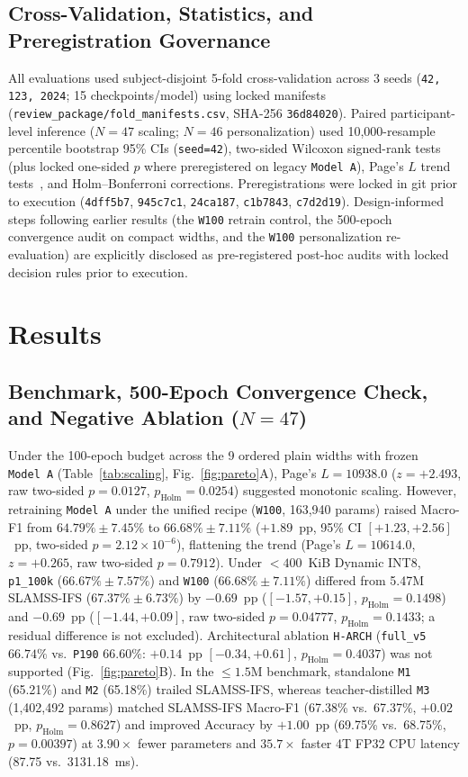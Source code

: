\documentclass[journal]{IEEEtran}
\begin{document}
\subsection{Cross-Validation, Statistics, and Preregistration Governance}
All evaluations used subject-disjoint 5-fold cross-validation across 3 seeds (\texttt{42, 123, 2024}; 15 checkpoints/model) using locked manifests (\texttt{review\_package/fold\_manifests.csv}, SHA-256 \texttt{36d84020}). Paired participant-level inference ($N=47$ scaling; $N=46$ personalization) used 10,000-resample percentile bootstrap 95\% CIs (\texttt{seed=42}), two-sided Wilcoxon signed-rank tests (plus locked one-sided $p$ where preregistered on legacy \texttt{Model~A}), Page's $L$ trend tests~\cite{page1963ordered}, and Holm--Bonferroni corrections. Preregistrations were locked in git prior to execution (\texttt{4dff5b7}, \texttt{945c7c1}, \texttt{24ca187}, \texttt{c1b7843}, \texttt{c7d2d19}). Design-informed steps following earlier results (the \texttt{W100} retrain control, the 500-epoch convergence audit on compact widths, and the \texttt{W100} personalization re-evaluation) are explicitly disclosed as pre-registered post-hoc audits with locked decision rules prior to execution.

\section{Results}
\subsection{Benchmark, 500-Epoch Convergence Check, and Negative Ablation ($N=47$)}
Under the 100-epoch budget across the 9 ordered plain widths with frozen \texttt{Model~A} (Table~\ref{tab:scaling}, Fig.~\ref{fig:pareto}A), Page's $L=10938.0$ ($z=+2.493$, raw two-sided $p=0.0127$, $p_{\text{Holm}}=0.0254$) suggested monotonic scaling. However, retraining \texttt{Model~A} under the unified recipe (\texttt{W100}, 163,940 params) raised Macro-F1 from $64.79\% \pm 7.45\%$ to $66.68\% \pm 7.11\%$ ($+1.89$~pp, 95\% CI $[+1.23, +2.56]$~pp, two-sided $p=2.12\times 10^{-6}$), flattening the trend (Page's $L=10614.0$, $z=+0.265$, raw two-sided $p=0.7912$). Under $<400$~KiB Dynamic INT8, \texttt{p1\_100k} ($66.67\% \pm 7.57\%$) and \texttt{W100} ($66.68\% \pm 7.11\%$) differed from 5.47M SLAMSS-IFS ($67.37\% \pm 6.73\%$) by $-0.69$~pp ($[-1.57, +0.15]$, $p_{\text{Holm}}=0.1498$) and $-0.69$~pp ($[-1.44, +0.09]$, raw two-sided $p=0.04777$, $p_{\text{Holm}}=0.1433$; a residual difference is not excluded). Architectural ablation \texttt{H-ARCH} (\texttt{full\_v5} $66.74\%$ vs.\ \texttt{P190} $66.60\%$: $+0.14$~pp $[-0.34, +0.61]$, $p_{\text{Holm}}=0.4037$) was not supported (Fig.~\ref{fig:pareto}B). In the $\le 1.5$M benchmark, standalone \texttt{M1} (65.21\%) and \texttt{M2} (65.18\%) trailed SLAMSS-IFS, whereas teacher-distilled \texttt{M3} (1,402,492 params) matched SLAMSS-IFS Macro-F1 (67.38\% vs.\ 67.37\%, $+0.02$~pp, $p_{\text{Holm}}=0.8627$) and improved Accuracy by $+1.00$~pp (69.75\% vs.\ 68.75\%, $p=0.00397$) at $3.90\times$ fewer parameters and $35.7\times$ faster 4T FP32 CPU latency (87.75 vs.\ 3131.18~ms).
\end{document}
